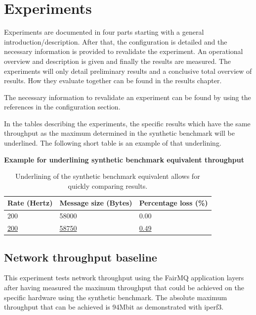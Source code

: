 \documentclass[]{article}
\begin{document}
\section{Experiments}
Experiments are documented in four parts starting with a general introduction/description. After that, the configuration is detailed and the necessary information is provided to revalidate the experiment. An operational overview and description is given and finally the results are measured. The experiments will only detail preliminary results and a conclusive total overview of results. How they evaluate together can be found in the results chapter. 

The necessary information to revalidate an experiment can be found by using the references in the configuration section.

In the tables describing the experiments, the specific results which have the same throughput as the maximum determined in the synthetic benchmark will be underlined. The following short table is an example of that underlining.

\begin{table}[H]
	\textbf{Example for underlining synthetic benchmark equivalent throughput}
	\begin{center}
		\begin{tabular}{ | l | l | l | }
			\hline
			\textbf{Rate (Hertz)} & \textbf{Message size (Bytes)} & \textbf{Percentage loss (\%)} \\ \hline
			
			200 & 58000 & 0.00 \\ \hline
			\underline{200} & \underline{58750} & \underline{0.49} \\ \hline
		\end{tabular}
		\caption{Underlining of the synthetic benchmark equivalent allows for quickly comparing results.}
		\label{tab:benchmark}
	\end{center}
\end{table}

\subsection{Network throughput baseline}
This experiment tests network throughput using the FairMQ application layers after having measured the maximum throughput that could be achieved on the specific hardware using the synthetic benchmark. The absolute maximum throughput that can be achieved is 94Mbit as demonstrated with iperf3.
\end{document}
